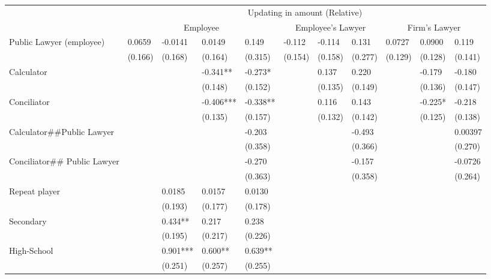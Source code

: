 \begin{tabular}{lllllllllll}
\cmidrule{2-11}\multicolumn{1}{l|}{} & \multicolumn{10}{c|}{Updating in amount (Relative)} \\
\cmidrule{2-11}      & \multicolumn{4}{c}{Employee}  & \multicolumn{3}{c}{Employee's Lawyer} & \multicolumn{3}{c}{Firm's  Lawyer} \\
\cmidrule{2-11}Public Lawyer (employee) & 0.0659 & -0.0141 & 0.0149 & 0.149 & -0.112 & -0.114 & 0.131 & 0.0727 & 0.0900 & 0.119 \\
      & (0.166) & (0.168) & (0.164) & (0.315) & (0.154) & (0.158) & (0.277) & (0.129) & (0.128) & (0.141) \\
Calculator &       &       & -0.341** & -0.273* &       & 0.137 & 0.220 &       & -0.179 & -0.180 \\
      &       &       & (0.148) & (0.152) &       & (0.135) & (0.149) &       & (0.136) & (0.147) \\
Conciliator &       &       & -0.406*** & -0.338** &       & 0.116 & 0.143 &       & -0.225* & -0.218 \\
      &       &       & (0.135) & (0.157) &       & (0.132) & (0.142) &       & (0.125) & (0.138) \\
Calculator\#\#Public Lawyer &       &       &       & -0.203 &       &       & -0.493 &       &       & 0.00397 \\
      &       &       &       & (0.358) &       &       & (0.366) &       &       & (0.270) \\
Conciliator\#\# Public Lawyer &       &       &       & -0.270 &       &       & -0.157 &       &       & -0.0726 \\
      &       &       &       & (0.363) &       &       & (0.358) &       &       & (0.264) \\
Repeat player &       & 0.0185 & 0.0157 & 0.0130 &       &       &       &       &       &  \\
      &       & (0.193) & (0.177) & (0.178) &       &       &       &       &       &  \\
Secondary &       & 0.434** & 0.217 & 0.238 &       &       &       &       &       &  \\
      &       & (0.195) & (0.217) & (0.226) &       &       &       &       &       &  \\
High-School &       & 0.901*** & 0.600** & 0.639** &       &       &       &       &       &  \\
      &       & (0.251) & (0.257) & (0.255) &       &       &       &       &       &  \\

\end{tabular}
